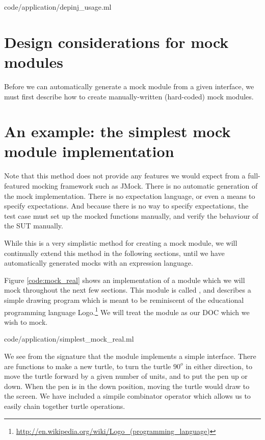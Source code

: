  {code/application/depinj_usage.ml}

\section{Design considerations for mock modules}
\label{application:manual-mock}

Before we can automatically generate a mock module from a given
interface, we must first describe how to create manually-written
(hard-coded) mock modules.

\section{An example: the simplest mock module implementation}
\label{application:simple}

Note that this method does not provide any features we would expect
from a full-featured mocking framework such as JMock. There is no
automatic generation of the mock implementation. There is no
expectation language, or even a means to specify expectations. And
because there is no way to specify expectations, the test case must
set up the mocked functions manually, and verify the behaviour of the
SUT manually.

While this is a very simplistic method for creating a mock module, we
will continually extend this method in the following sections, until
we have automatically generated mocks with an expression
language.

Figure \ref{code:mock_real} shows an implementation of a module which
we will mock throughout the next few sections. This module is called
, and describes a simple drawing program which is meant
to be reminiscent of the educational programming language
Logo.\footnote{\url{http://en.wikipedia.org/wiki/Logo_(programming_language)}}
We will treat the  module as our DOC which we wish to
mock.

 {code/application/simplest_mock_real.ml}

We see from the  signature that the  module
implements a simple interface. There are functions to make a new
turtle, to turn the turtle $90^o$ in either direction, to move the
turtle forward by a given number of units, and to put the pen up or
down. When the pen is in the down position, moving the turtle would
draw to the screen. We have included a simpile combinator operator
\code{>>} which allows us to easily chain together turtle operations.

